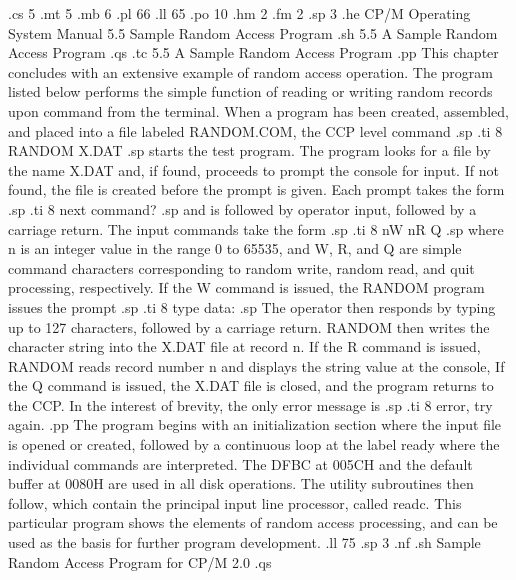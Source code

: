 .cs 5
.mt 5
.mb 6
.pl 66
.ll 65
.po 10
.hm 2
.fm 2
.sp 3
.he CP/M Operating System Manual   5.5   Sample Random Access Program
.sh
5.5  A Sample Random Access Program
.qs
.tc    5.5  A Sample Random Access Program
.pp
This chapter concludes with an extensive example of random access operation.
The program listed below performs the simple function of reading or writing
random records upon command from the terminal.  When a
program has been created, assembled, and placed into a file 
labeled RANDOM.COM, the CCP level command
.sp
.ti 8
RANDOM X.DAT
.sp
starts the test program.  The program looks for a file by the 
name X.DAT and, if found, proceeds to prompt the console for 
input.  If not found, the file is created before the prompt is 
given.  Each prompt takes the form
.sp
.ti 8
next command?
.sp
and is followed by operator input, followed by a carriage 
return.  The input commands take the form
.sp
.ti 8
nW  nR  Q
.sp
where n is an integer value in the range 0 to 65535, and W, R, 
and Q are simple command characters corresponding to random 
write, random read, and quit processing, respectively.  If the W 
command is issued, the RANDOM program issues the prompt
.sp
.ti 8
type data:
.sp
The operator then responds by typing up to 127 characters, 
followed by a carriage return.  RANDOM then writes the character 
string into the X.DAT file at record n.  If the R command is 
issued, RANDOM reads record number n and displays the string 
value at the console,  If the Q command is issued, the X.DAT file 
is closed, and the program returns to the CCP.  In the interest 
of brevity, the only error message is
.sp
.ti 8
error, try again.
.pp
The program begins with an initialization section where the input 
file is opened or created, followed by a continuous loop at the 
label ready where the individual commands are interpreted.  The 
DFBC at 005CH and the default buffer at 0080H are used in all 
disk operations.  The utility subroutines then follow, which 
contain the principal input line processor, called readc.  This 
particular program shows the elements of random access 
processing, and can be used as the basis for further program 
development.
.ll 75
.sp 3
.nf
.sh
                            Sample Random Access Program for CP/M 2.0
.qs

